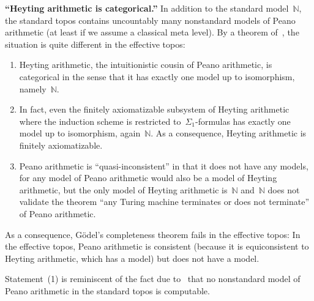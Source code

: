 \documentclass[graybox]{svmult}
\newcommand{\NN}{\mathbb{N}}
\renewcommand{\_}{\mathpunct{.}\,}
\newcommand{\effective}{ef{}fective\xspace}
\newcommand{\?}{\,{:}\,}
\begin{document}
\begin{example}\textbf{``Heyting arithmetic is categorical.''} In addition to the standard
model~$\NN$, the standard topos contains uncountably many nonstandard models of
Peano arithmetic (at least if we assume a classical meta level). By a theorem
of~\cite{berg-oosten:arithmetic}, the situation
is quite different in the \effective topos:
\begin{enumerate}
\item Heyting arithmetic, the intuitionistic cousin of Peano arithmetic, is
categorical in the sense that it has
exactly one model up to isomorphism, namely~$\NN$.
\item In fact, even the finitely axiomatizable subsystem of Heyting arithmetic
where the induction scheme is restricted to~$\Sigma_1$-formulas has exactly one
model up to isomorphism, again~$\NN$. As a consequence, Heyting arithmetic is
finitely axiomatizable.
\item Peano arithmetic is ``quasi-inconsistent'' in that it does not have any
models, for any model of Peano arithmetic would also be a model of Heyting
arithmetic, but the only model of Heyting arithmetic is~$\NN$ and~$\NN$ does
not validate the theorem ``any Turing machine terminates or does not
terminate'' of Peano arithmetic.
\end{enumerate}
As a consequence, Gödel's completeness theorem fails in the \effective topos:
In the \effective topos, Peano arithmetic is consistent (because it is
equiconsistent to Heyting arithmetic, which has a model) but does not have a
model.

Statement~(1) is reminiscent of the fact due to~\cite{tennenbaum:models} that no nonstandard model of
Peano arithmetic in the standard topos is computable.
\end{example}
\end{document}
